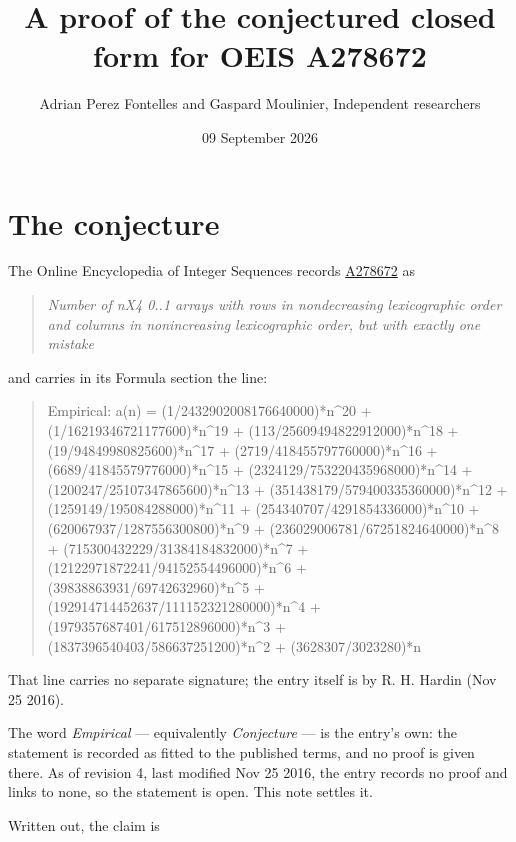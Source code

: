 \documentclass[11pt]{article}
\title{A proof of the conjectured closed form for OEIS A278672}
\author{Adrian Perez Fontelles and Gaspard Moulinier, Independent researchers}
\date{09 September 2026}
\theoremstyle{definition}
\begin{document}
\maketitle
\section{The conjecture}

The Online Encyclopedia of Integer Sequences records \href{https://oeis.org/A278672}{A278672} as

\begin{quote}\itshape Number of nX4 0..1 arrays with rows in nondecreasing lexicographic order and columns in nonincreasing lexicographic order, but with exactly one mistake\end{quote}

and carries in its Formula section the line:

\begin{quote}\ttfamily Empirical: a(n) = (1/2432902008176640000)*n\textasciicircum{}20 + (1/16219346721177600)*n\textasciicircum{}19 + (113/25609494822912000)*n\textasciicircum{}18 + (19/94849980825600)*n\textasciicircum{}17 + (2719/418455797760000)*n\textasciicircum{}16 + (6689/41845579776000)*n\textasciicircum{}15 + (2324129/753220435968000)*n\textasciicircum{}14 + (1200247/25107347865600)*n\textasciicircum{}13 + (351438179/579400335360000)*n\textasciicircum{}12 + (1259149/195084288000)*n\textasciicircum{}11 + (254340707/4291854336000)*n\textasciicircum{}10 + (620067937/1287556300800)*n\textasciicircum{}9 + (236029006781/67251824640000)*n\textasciicircum{}8 + (715300432229/31384184832000)*n\textasciicircum{}7 + (12122971872241/94152554496000)*n\textasciicircum{}6 + (39838863931/69742632960)*n\textasciicircum{}5 + (192914714452637/111152321280000)*n\textasciicircum{}4 + (1979357687401/617512896000)*n\textasciicircum{}3 + (1837396540403/586637251200)*n\textasciicircum{}2 + (3628307/3023280)*n\end{quote}

That line carries no separate signature; the entry itself is by R. H. Hardin (Nov 25 2016).

The word {\itshape Empirical} --- equivalently {\itshape Conjecture} --- is the entry's own: the statement is recorded as fitted to the published terms, and no proof is given there. As of revision 4, last modified Nov 25 2016, the entry records no proof and links to none, so the statement is open. This note settles it.

Written out, the claim is
\end{document}

